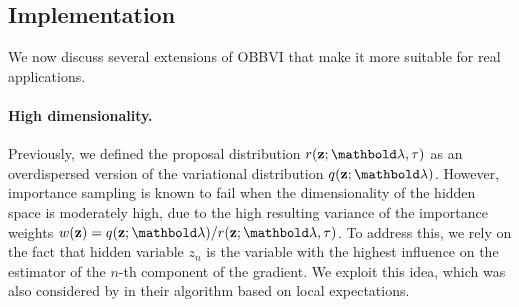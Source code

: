 \documentclass[]{article}
\begin{document}


\vspace*{-5pt}
\subsection{Implementation}\label{sec:extensions}
\vspace*{-5pt}

We now discuss several extensions of \gls{OBBVI} that make it more
suitable for real applications.

\paragraph{High dimensionality.}
Previously, we defined the proposal distribution $r(\bz;\blambda,\tau)$ as an overdispersed version of the variational distribution $q(\bz;\blambda)$. However, importance sampling is known to fail when the dimensionality of the hidden space is moderately high, due to the high resulting variance of the importance weights $w(\bz)=q(\bz;\blambda)/r(\bz;\blambda,\tau)$. To address this, we rely on the fact that hidden variable $z_n$ is the variable with the highest influence on the estimator of the $n$-th component of the gradient. We exploit this idea, which was also considered by \citet{Titsias2015} in their algorithm based on local expectations.
\end{document}
